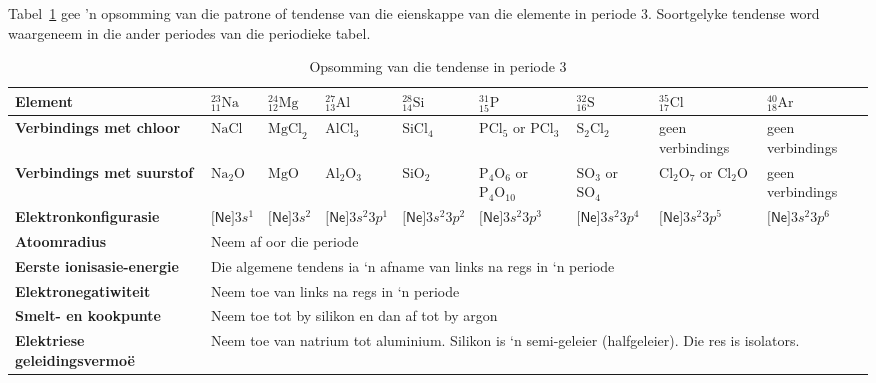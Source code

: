
 Tabel~\ref{tab:period3trends} gee 'n opsomming van die patrone of tendense van die eienskappe van die elemente in periode 3. Soortgelyke tendense word waargeneem in die ander periodes van die periodieke tabel. \\
\begin{table}[H]
 \begin{center}
  \begin{tabular}{|p{1.5cm}|p{1cm}|p{1cm}|p{1.5cm}|p{1.5cm}|p{1.5cm}|p{1.5cm}|p{1.5cm}|p{1.5cm}|} \hline
\textbf{Element} & $^{23}_{11}\text{Na}$ & $^{24}_{12}\text{Mg}$ &  $^{27}_{13}\text{Al}$ & $^{28}_{14}\text{Si}$ &  $^{31}_{15}\text{P}$ & $^{32}_{16}\text{S}$ & $^{35}_{17}\text{Cl}$ & $^{40}_{18}\text{Ar}$\\ \hline
   \textbf{Verbindings met chloor} & $\text{NaCl}$ & $\text{MgCl}_2$ & $\text{AlCl}_{3}$ & $\text{SiCl}_{4}$ & $\text{PCl}_{5}$ or $\text{PCl}_{3}$ & $\text{S}_{2}\text{Cl}_{2}$ & geen verbindings & geen verbindings \\ \hline
\textbf{Verbindings met suurstof} & $\text{Na}_{2}\text{O}$ & $\text{MgO}$ & $\text{Al}_{2}\text{O}_{3}$ & $\text{SiO}_{2}$ & $\text{P}_{4}\text{O}_{6}$ or $\text{P}_{4}\text{O}_{10}$ & $\text{SO}_{3}$ or $\text{SO}_{4}$ & $\text{Cl}_{2}\text{O}_{7}$ or $\text{Cl}_{2}\text{O}$ & geen verbindings \\ \hline
\textbf{Elektronkonfigurasie} & $\textsf{[Ne]}3s^{1}$ & $\textsf{[Ne]}3s^{2}$ & $\textsf{[Ne]}3s^{2}3p^{1}$ & $\textsf{[Ne]}3s^{2}3p^{2}$ & $\textsf{[Ne]}3s^{2}3p^{3}$ & $\textsf{[Ne]}3s^{2}3p^{4}$ & $\textsf{[Ne]}3s^{2}3p^{5}$ & $\textsf{[Ne]}3s^{2}3p^{6}$ \\ \hline
\textbf{Atoomradius} & \multicolumn{8}{p{8cm}|}{Neem af oor die periode} \\ \hline
\textbf{Eerste ionisasie-energie} & \multicolumn{8}{p{8cm}|}{Die algemene tendens ia ‘n afname van links na regs in ‘n periode} \\ \hline
\textbf{Elektronegatiwiteit} & \multicolumn{8}{p{8cm}|}{Neem toe van links na regs in ‘n periode} \\ \hline
\textbf{Smelt- en kookpunte} & \multicolumn{8}{p{8cm}|}{Neem toe tot by silikon en dan af tot by argon} \\ \hline
\textbf{Elektriese geleidingsvermo\"{e}} & \multicolumn{8}{p{10cm}|}{Neem toe van natrium tot aluminium. Silikon is ‘n semi-geleier (halfgeleier). Die res is isolators. } \\ \hline
  \end{tabular}
\caption{Opsomming van die tendense in periode 3}
\label{tab:period3trends}
 \end{center}

\end{table}
